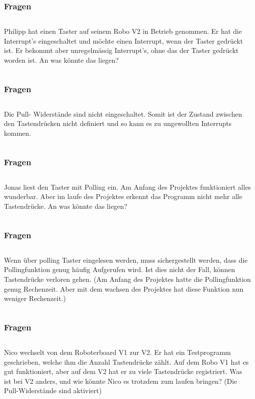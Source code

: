 
\begin{frame}
  \frametitle{Fragen}
	    \begin{column}{1\linewidth}
		Philipp hat einen Taster auf seinem Robo V2 in Betrieb genommen. Er hat die Interrupt’s eingeschaltet und möchte einen Interrupt, wenn der Taster gedrückt ist. Er bekommt aber unregelmässig Interrupt's, ohne das der Taster gedrückt worden ist. An was könnte das liegen?
	    \end{column}
\end{frame}

\begin{frame}
	\frametitle{Fragen}
	\begin{column}{1\linewidth}
		Die Pull- Widerstände sind nicht eingeschaltet. Somit ist der Zustand zwischen den Tastendrücken nicht definiert und so kann es zu ungewollten Interrupts kommen. 
	\end{column}
\end{frame}

\begin{frame}
	\frametitle{Fragen}
	\begin{column}{1\linewidth}
		Jonas liest den Taster mit Polling ein. Am Anfang des Projektes funktioniert alles wunderbar. Aber im laufe des Projektes erkennt das Programm nicht mehr alle Tastendrücke. An was könnte das liegen?
	\end{column}
\end{frame}

\begin{frame}
	\frametitle{Fragen}
	\begin{column}{1\linewidth}
		Wenn über polling Taster eingelesen werden, muss sichergestellt werden, dass die Pollingfunktion genug häufig Aufgerufen wird. Ist dies nicht der Fall, können Tastendrücke verloren gehen. (Am Anfang des Projektes hatte die Pollingfunktion genug Rechenzeit. Aber mit dem wachsen des Projektes hat diese Funktion nun weniger Rechenzeit.)
	\end{column}
\end{frame}

\begin{frame}
	\frametitle{Fragen}
	\begin{column}{1\linewidth}
	Nico wechselt von dem Roboterboard V1 zur V2. Er hat ein Testprogramm geschrieben, welche ihm die Anzahl Tastendrücke zählt. Auf dem Robo V1 hat es gut funktioniert, aber auf dem V2 hat er zu viele Tastendrücke registriert. Was ist bei V2 anders, und wie könnte Nico es trotzdem zum laufen bringen? (Die Pull-Widerstände sind aktiviert)
	\end{column}
\end{frame}

